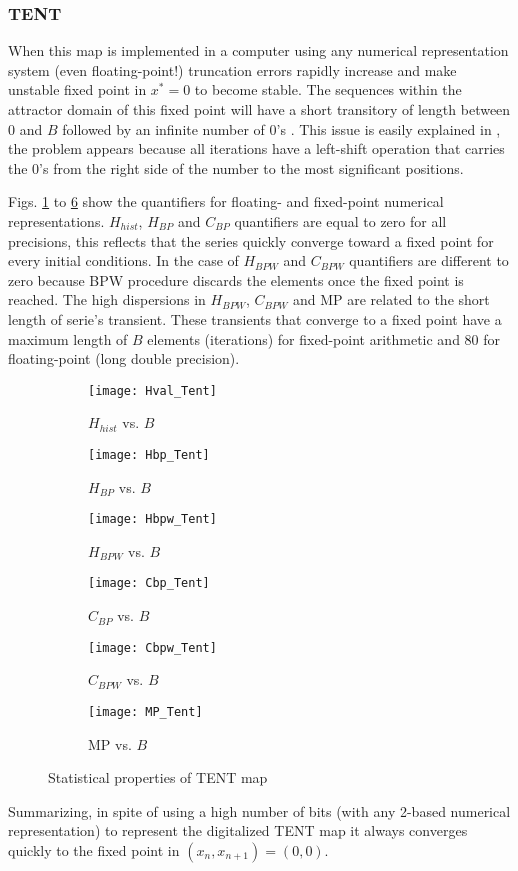 \subsubsection{TENT} \label{sssec:tent}

When this map is implemented in a computer using any numerical representation system (even floating-point!) truncation errors rapidly increase and make unstable fixed point in $x^*=0$ to become stable.
The sequences within the attractor domain of this fixed point will have a short transitory of length between $0$ and $B$ followed by an infinite number of $0$'s \cite{Jessa2002,Callegari}.
This issue is easily explained in \cite{Li2004}, the problem appears because all iterations have a left-shift operation that carries the $0$'s from the right side of the number to the most significant positions.

Figs. \ref{fig:Hval_Tent} to \ref{fig:MP_Tent} show the quantifiers for floating- and fixed-point numerical representations.
$H_{hist}$, $H_{BP}$ and $C_{BP}$ quantifiers are equal to zero for all precisions, this reflects that the series quickly converge toward a fixed point for every initial conditions.
In the case of $H_{BPW}$ and $C_{BPW}$ quantifiers are different to zero because BPW procedure discards the elements once the fixed point is reached.
The high dispersions in $H_{BPW}$, $C_{BPW}$ and MP are related to the short length of serie's transient.
These transients that converge to a fixed point have a maximum length of $B$ elements (iterations) for fixed-point arithmetic and $80$ for floating-point (long double precision).

\begin{figure}[htpb]
	\centering
	\begin{subfigure}[b]{0.49\textwidth}
		\texttt{[image: Hval\_Tent]}
		\caption{$H_{hist}$ vs. $B$}
		\label{fig:Hval_Tent}
	\end{subfigure}
	\begin{subfigure}[b]{0.49\textwidth}
		\texttt{[image: Hbp\_Tent]}
		\caption{$H_{BP}$ vs. $B$}
		\label{fig:Hbp_Tent}
	\end{subfigure}
	\begin{subfigure}[b]{0.49\textwidth}
		\texttt{[image: Hbpw\_Tent]}
		\caption{$H_{BPW}$ vs. $B$}
		\label{fig:Hbpw_Tent}
	\end{subfigure}
	\begin{subfigure}[b]{0.49\textwidth}
		\texttt{[image: Cbp\_Tent]}
		\caption{$C_{BP}$ vs. $B$}
		\label{fig:Cbp_Tent}
	\end{subfigure}
	\begin{subfigure}[b]{0.49\textwidth}
		\texttt{[image: Cbpw\_Tent]}
		\caption{$C_{BPW}$ vs. $B$}
		\label{fig:Cbpw_Tent}
	\end{subfigure}
	\begin{subfigure}[b]{0.49\textwidth}
		\texttt{[image: MP\_Tent]}
		\caption{MP vs. $B$}
		\label{fig:MP_Tent}
	\end{subfigure}
	\caption{Statistical properties of TENT map}
	\label{fig:TENT_QuantiB}
\end{figure}

Summarizing, in spite of using a high number of bits (with any 2-based numerical representation) to represent the digitalized TENT map it always converges quickly to the fixed point in $(x_n, x_{n+1})=(0, 0)$.

